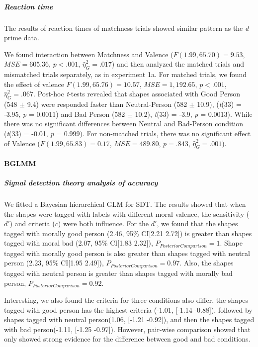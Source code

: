 \documentclass[
  english,
  man]{apa6}
\let\oldparagraph\paragraph
\renewcommand{\paragraph}[1]{\oldparagraph{#1}\mbox{}}
\let\oldsubparagraph\subparagraph
\renewcommand{\subparagraph}[1]{\oldsubparagraph{#1}\mbox{}}
\begin{document}
\hypertarget{reaction-time-2}{%
\subparagraph{Reaction time}\label{reaction-time-2}}

The results of reaction times of matchness trials showed similar pattern as the \emph{d} prime data.

We found interaction between Matchness and Valence (\(F(1.99, 65.70) = 9.53\), \(\mathit{MSE} = 605.36\), \(p < .001\), \(\hat{\eta}^2_G = .017\)) and then analyzed the matched trials and mismatched trials separately, as in experiment 1a. For matched trials, we found the effect of valence \(F(1.99, 65.76) = 10.57\), \(\mathit{MSE} = 1,192.65\), \(p < .001\), \(\hat{\eta}^2_G = .067\). Post-hoc \emph{t}-tests revealed that shapes associated with Good Person (548 \(\pm\) 9.4) were responded faster than Neutral-Person (582 \(\pm\) 10.9), (\emph{t}(33) = -3.95, \emph{p} = 0.0011) and Bad Person (582 \(\pm\) 10.2), \emph{t}(33) = -3.9, \emph{p} = 0.0013). While there was no significant differences between Neutral and Bad-Person condition (\emph{t}(33) = -0.01, \emph{p} = 0.999). For non-matched trials, there was no significant effect of Valence (\(F(1.99, 65.83) = 0.17\), \(\mathit{MSE} = 489.80\), \(p = .843\), \(\hat{\eta}^2_G = .001\)).

\hypertarget{bglmm}{%
\paragraph{BGLMM}\label{bglmm}}

\hypertarget{signal-detection-theory-analysis-of-accuracy-2}{%
\subparagraph{Signal detection theory analysis of accuracy}\label{signal-detection-theory-analysis-of-accuracy-2}}

We fitted a Bayesian hierarchical GLM for SDT. The results showed that when the shapes were tagged with labels with different moral valence, the sensitivity (\(d'\)) and criteria (\(c\)) were both influence. For the \(d'\), we found that the shapes tagged with morally good person (2.46, 95\% CI{[}2.21 2.72{]}) is greater than shapes tagged with moral bad (2.07, 95\% CI{[}1.83 2.32{]}), \(P_{PosteriorComparison} = 1\). Shape tagged with morally good person is also greater than shapes tagged with neutral person (2.23, 95\% CI{[}1.95 2.49{]}), \(P_{PosteriorComparison} = 0.97\). Also, the shapes tagged with neutral person is greater than shapes tagged with morally bad person, \(P_{PosteriorComparison} = 0.92\).

Interesting, we also found the criteria for three conditions also differ, the shapes tagged with good person has the highest criteria (-1.01, {[}-1.14 -0.88{]}), followed by shapes tagged with neutral person(1.06, {[}-1.21 -0.92{]}), and then the shapes tagged with bad person(-1.11, {[}-1.25 -0.97{]}). However, pair-wise comparison showed that only showed strong evidence for the difference between good and bad conditions.
\end{document}
